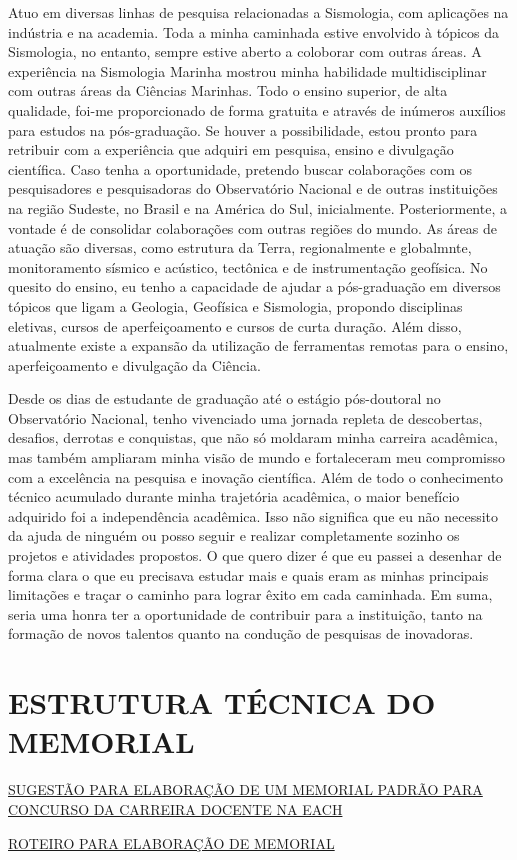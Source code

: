 \documentclass[10pt,a4paper,oneside]{book}
\begin{document}
Atuo em diversas linhas de pesquisa relacionadas a Sismologia, com aplicações na indústria e na academia. Toda a minha caminhada estive envolvido à tópicos da Sismologia, no entanto, sempre estive aberto a coloborar com outras áreas. A experiência na Sismologia Marinha mostrou minha habilidade multidisciplinar com outras áreas da Ciências Marinhas. Todo o ensino superior, de alta qualidade, foi-me proporcionado de forma gratuita e através de inúmeros auxílios para estudos na pós-graduação. Se houver a possibilidade, estou pronto para retribuir com a experiência que adquiri em pesquisa, ensino e divulgação científica. Caso tenha a oportunidade, pretendo buscar colaborações com os pesquisadores e pesquisadoras do Observatório Nacional e de outras instituições na região Sudeste, no Brasil e  na América do Sul, inicialmente. Posteriormente, a vontade é de consolidar colaborações com outras regiões do mundo. As áreas de atuação são diversas, como estrutura da Terra, regionalmente e globalmnte, monitoramento sísmico e acústico, tectônica e de instrumentação geofísica. No quesito do ensino, eu tenho a capacidade de ajudar a pós-graduação em diversos tópicos que ligam a Geologia, Geofísica e Sismologia, propondo disciplinas eletivas, cursos de aperfeiçoamento e cursos de curta duração. Além disso, atualmente existe a expansão da utilização de ferramentas remotas para o ensino, aperfeiçoamento e divulgação da Ciência. 

Desde os dias de estudante de graduação até o estágio pós-doutoral no Observatório Nacional, tenho vivenciado uma jornada repleta de descobertas, desafios, derrotas e conquistas, que não só moldaram minha carreira acadêmica, mas também ampliaram minha visão de mundo e fortaleceram meu compromisso com a excelência na pesquisa e inovação científica. Além de todo o conhecimento técnico acumulado durante minha trajetória acadêmica, o maior benefício adquirido foi a independência acadêmica. Isso não significa que eu não necessito da ajuda de ninguém ou posso seguir e realizar completamente sozinho os projetos e atividades propostos. O que quero dizer é que eu passei a desenhar de forma clara o que eu precisava estudar mais e quais eram as minhas principais limitações e traçar o caminho para lograr êxito em cada caminhada. Em suma, seria uma honra ter a oportunidade de contribuir para a instituição, tanto na formação de novos talentos quanto na condução de pesquisas de inovadoras.


\chapter{ESTRUTURA TÉCNICA DO MEMORIAL }
\label{cap_estrutura}

\href{https://www.progpe.ufscar.br/arquivos/servicos/avaliacao-e-desenvolvimento/carreira-professor-magisterio-superior/anexo-3-sugestao-modelo-memorial-usp.pdf}{SUGESTÃO PARA ELABORAÇÃO DE UM MEMORIAL PADRÃO PARA CONCURSO DA
CARREIRA DOCENTE NA EACH}

\href{http://www.ufrrj.br/concursos/anexoed192006.pdf}{ROTEIRO PARA ELABORAÇÃO DE MEMORIAL}
\end{document}
